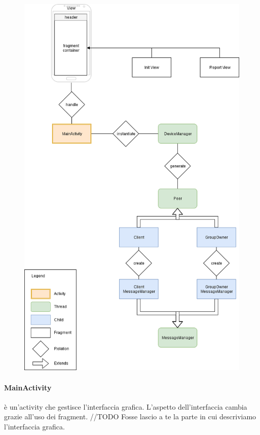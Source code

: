 \documentclass{llncs}
\begin{document}
\begin{figure}[H]
	\includegraphics[scale=0.3,center]{img/class.png}
	\caption{}
	\label{class}
\end{figure}
\noindent

\paragraph{MainActivity} è un'activity che gestisce l'interfaccia grafica. L'aspetto dell'interfaccia cambia grazie all'uso dei fragment.
//TODO Fosse lascio a te la parte in cui descriviamo l'interfaccia grafica.
\end{document}

